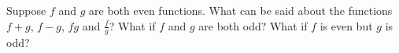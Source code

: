 {Suppose $f$ and $g$ are both even functions.  What can be said about the functions $f+g$, $f-g$, $fg$ and $\frac{f}{g}$?  What if $f$ and $g$ are both odd?  What if $f$ is even but $g$ is odd?  }
{}